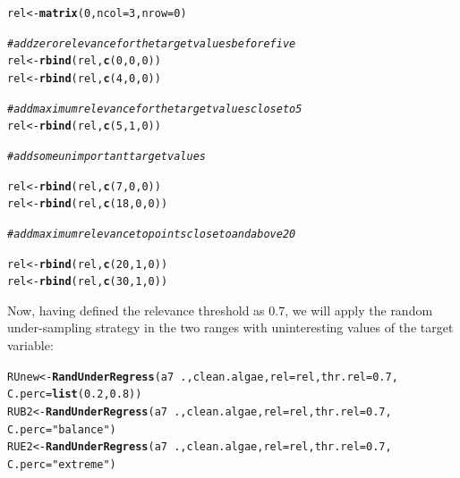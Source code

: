 \documentclass[10pt,a4paper]{article}\usepackage[]{graphicx}\usepackage[]{color}
\makeatletter
\newcommand{\hlnum}[1]{\textcolor[rgb]{0.686,0.059,0.569}{#1}}%
\newcommand{\hlstr}[1]{\textcolor[rgb]{0.192,0.494,0.8}{#1}}%
\newcommand{\hlcom}[1]{\textcolor[rgb]{0.678,0.584,0.686}{\textit{#1}}}%
\newcommand{\hlopt}[1]{\textcolor[rgb]{0,0,0}{#1}}%
\newcommand{\hlstd}[1]{\textcolor[rgb]{0.345,0.345,0.345}{#1}}%
\newcommand{\hlkwb}[1]{\textcolor[rgb]{0.69,0.353,0.396}{#1}}%
\newcommand{\hlkwc}[1]{\textcolor[rgb]{0.333,0.667,0.333}{#1}}%
\newcommand{\hlkwd}[1]{\textcolor[rgb]{0.737,0.353,0.396}{\textbf{#1}}}%
\newenvironment{kframe}{%
 \def\at@end@of@kframe{}%
 \ifinner\ifhmode%
  \def\at@end@of@kframe{\end{minipage}}%
  \begin{minipage}{\columnwidth}%
 \fi\fi%
 \def\FrameCommand##1{\hskip\@totalleftmargin \hskip-\fboxsep
 \colorbox{shadecolor}{##1}\hskip-\fboxsep
     \hskip-\linewidth \hskip-\@totalleftmargin \hskip\columnwidth}%
 \MakeFramed {\advance\hsize-\width
   \@totalleftmargin\z@ \linewidth\hsize
   \@setminipage}}%
 {\par\unskip\endMakeFramed%
 \at@end@of@kframe}
\newenvironment{knitrout}{}{} %
\makeatother
\begin{document}
\begin{knitrout}\footnotesize
{}\color{fgcolor}\begin{kframe}
\begin{alltt}
\hlstd{rel} \hlkwb{<-} \hlkwd{matrix}\hlstd{(}\hlnum{0}\hlstd{,}\hlkwc{ncol}\hlstd{=}\hlnum{3}\hlstd{,}\hlkwc{nrow}\hlstd{=}\hlnum{0}\hlstd{)}

\hlcom{# add zero relevance for the target values before five}
\hlstd{rel} \hlkwb{<-} \hlkwd{rbind}\hlstd{(rel,} \hlkwd{c}\hlstd{(}\hlnum{0}\hlstd{,}\hlnum{0}\hlstd{,}\hlnum{0}\hlstd{))}
\hlstd{rel} \hlkwb{<-} \hlkwd{rbind}\hlstd{(rel,}\hlkwd{c}\hlstd{(}\hlnum{4}\hlstd{,}\hlnum{0}\hlstd{,}\hlnum{0}\hlstd{))}

\hlcom{# add maximum relevance for the target values close to 5}
\hlstd{rel} \hlkwb{<-} \hlkwd{rbind}\hlstd{(rel,} \hlkwd{c}\hlstd{(}\hlnum{5}\hlstd{,}\hlnum{1}\hlstd{,}\hlnum{0}\hlstd{))}

\hlcom{# add some unimportant target values }

\hlstd{rel} \hlkwb{<-} \hlkwd{rbind}\hlstd{(rel,} \hlkwd{c}\hlstd{(}\hlnum{7}\hlstd{,}\hlnum{0}\hlstd{,}\hlnum{0}\hlstd{))}
\hlstd{rel} \hlkwb{<-} \hlkwd{rbind}\hlstd{(rel,} \hlkwd{c}\hlstd{(}\hlnum{18}\hlstd{,}\hlnum{0}\hlstd{,}\hlnum{0}\hlstd{))}

\hlcom{# add maximum relevance to points close to and above 20}

\hlstd{rel} \hlkwb{<-} \hlkwd{rbind}\hlstd{(rel,} \hlkwd{c}\hlstd{(}\hlnum{20}\hlstd{,}\hlnum{1}\hlstd{,}\hlnum{0}\hlstd{))}
\hlstd{rel} \hlkwb{<-} \hlkwd{rbind}\hlstd{(rel,} \hlkwd{c}\hlstd{(}\hlnum{30}\hlstd{,}\hlnum{1}\hlstd{,}\hlnum{0}\hlstd{))}
\end{alltt}
\end{kframe}
\end{knitrout}

Now, having defined the relevance threshold as 0.7, we will apply the random under-sampling strategy in the two ranges with uninteresting values of the target variable:

\begin{knitrout}\footnotesize
{}\color{fgcolor}\begin{kframe}
\begin{alltt}
\hlstd{RUnew} \hlkwb{<-} \hlkwd{RandUnderRegress}\hlstd{(a7}\hlopt{~}\hlstd{., clean.algae,} \hlkwc{rel}\hlstd{=rel,} \hlkwc{thr.rel}\hlstd{=}\hlnum{0.7}\hlstd{,}
                          \hlkwc{C.perc}\hlstd{=}\hlkwd{list}\hlstd{(}\hlnum{0.2}\hlstd{,}\hlnum{0.8}\hlstd{))}
\hlstd{RUB2} \hlkwb{<-} \hlkwd{RandUnderRegress}\hlstd{(a7}\hlopt{~}\hlstd{., clean.algae,} \hlkwc{rel}\hlstd{=rel,} \hlkwc{thr.rel}\hlstd{=}\hlnum{0.7}\hlstd{,}
                         \hlkwc{C.perc}\hlstd{=}\hlstr{"balance"}\hlstd{)}
\hlstd{RUE2} \hlkwb{<-} \hlkwd{RandUnderRegress}\hlstd{(a7}\hlopt{~}\hlstd{., clean.algae,} \hlkwc{rel}\hlstd{=rel,} \hlkwc{thr.rel}\hlstd{=}\hlnum{0.7}\hlstd{,}
                         \hlkwc{C.perc}\hlstd{=}\hlstr{"extreme"}\hlstd{)}
\end{alltt}
\end{kframe}
\end{knitrout}
\end{document}
